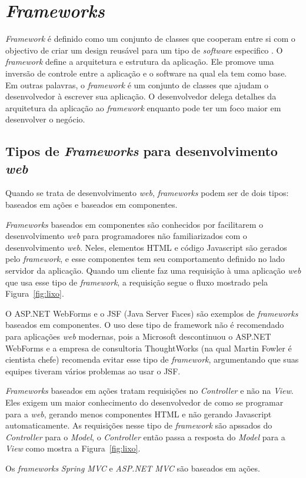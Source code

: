 \section{\textit{Frameworks}}

\textit{Framework} é definido como um conjunto de classes que cooperam entre si com o objectivo de criar um design reusável para um tipo de \textit{software} especifico \cite{28}.
O \textit{framework} define a arquitetura e estrutura da aplicação. Ele promove uma inversão de controle entre a aplicação e o software na qual ela tem como base. 
Em outras palavras, o \textit{framework} é um conjunto de classes que ajudam o desenvolvedor à escrever sua aplicação. 
O desenvolvedor delega detalhes da arquitetura da aplicação ao \textit{framework} enquanto pode ter um foco maior em desenvolver o negócio.

\subsection{Tipos de \textit{Frameworks} para desenvolvimento \textit{web}}

Quando se trata de desenvolvimento \textit{web}, \textit{frameworks} podem ser de dois tipos: baseados em ações e baseados em componentes.

\textit{Frameworks} baseados em componentes são conhecidos por facilitarem o desenvolvimento \textit{web} para programadores não familiarizados com o desenvolvimento \textit{web}. 
Neles, elementos HTML e código Javascript são gerados pelo \textit{framework}, e esse componentes tem seu comportamento definido no lado servidor da aplicação.
Quando um cliente faz uma requisição à uma aplicação \textit{web} que usa esse tipo de \textit{framework}, a requisição segue o fluxo mostrado pela Figura~\ref{fig:lixo}.


O ASP.NET WebForms e o JSF (Java Server Faces) são exemplos de \textit{frameworks} baseados em componentes. O uso dese tipo de framework não é recomendado para aplicações \textit{web} modernas, 
pois a Microsoft descontinuou o ASP.NET WebForms e a empresa de consultoria ThoughtWorks (na qual Martin Fowler é cientista chefe) recomenda evitar esse tipo de \textit{framework}, 
argumentando que suas equipes tiveram vários problemas ao usar o JSF.

\textit{Frameworks} baseados em ações tratam requisições no \textit{Controller} e não na \textit{View}. 
Eles exigem um maior conhecimento do desenvolvedor de como se programar para a \textit{web}, gerando menos componentes HTML e não gerando Javascript automaticamente. 
As requisições nesse tipo de \textit{framework} são apssados do \textit{Controller} para o \textit{Model}, o \textit{Controller} então passa a resposta do \textit{Model} para a \textit{View} como mostra a Figura~\ref{fig:lixo}.


Os \textit{frameworks} \textit{Spring MVC} e \textit{ASP.NET MVC} são baseados em ações.
